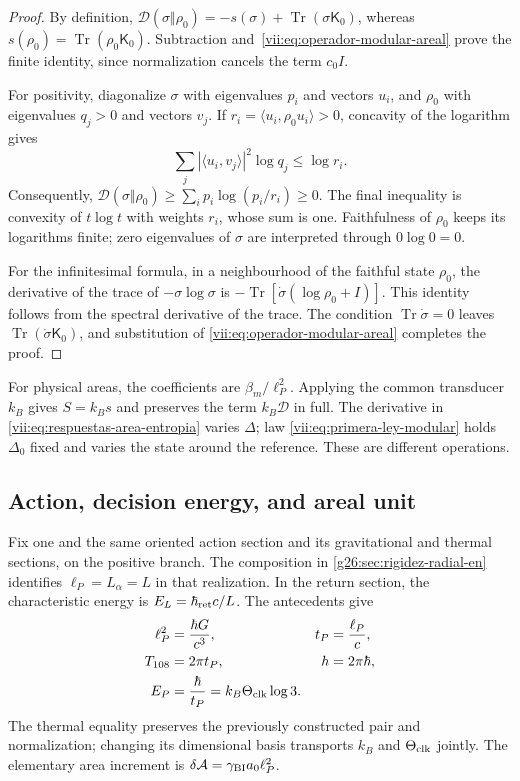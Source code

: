 \begin{proof}
By definition,
\(\mathcal D(\sigma\Vert\rho_0)=-s(\sigma)
+\operatorname{Tr}(\sigma\mathsf K_0)\), whereas
\(s(\rho_0)=\operatorname{Tr}(\rho_0\mathsf K_0)\).
Subtraction and~\eqref{vii:eq:operador-modular-areal} prove the finite
identity, since normalization cancels the term \(c_0I\).

For positivity, diagonalize \(\sigma\) with eigenvalues
\(p_i\) and vectors \(u_i\), and \(\rho_0\) with eigenvalues
\(q_j>0\) and vectors \(v_j\). If
\(r_i=\langle u_i,\rho_0u_i\rangle>0\), concavity of the
logarithm gives
\[
 \sum_j|\langle u_i,v_j\rangle|^2\log q_j\le\log r_i.
\]
Consequently,
\(\mathcal D(\sigma\Vert\rho_0)
\ge\sum_i p_i\log(p_i/r_i)\ge0\).
The final inequality is convexity of \(t\log t\) with weights
\(r_i\), whose sum is one. Faithfulness of \(\rho_0\) keeps its
logarithms finite; zero eigenvalues of \(\sigma\) are
interpreted through \(0\log0=0\).

For the infinitesimal formula, in a neighbourhood of the faithful state \(\rho_0\),
the derivative of the trace of \(-\sigma\log\sigma\) is
\(-\operatorname{Tr}[\dot\sigma(\log\rho_0+I)]\).
This identity follows from the spectral derivative of the trace.
The condition \(\operatorname{Tr}\dot\sigma=0\) leaves
\(\operatorname{Tr}(\dot\sigma\mathsf K_0)\), and substitution of
\eqref{vii:eq:operador-modular-areal} completes the proof.
\end{proof}

For physical areas, the coefficients are \(\beta_m/\ell_P^2\).
Applying the common transducer \(k_B\) gives \(S=k_Bs\) and
preserves the term \(k_B\mathcal D\) in full. The derivative in
\eqref{vii:eq:respuestas-area-entropia} varies \(\Delta\); law
\eqref{vii:eq:primera-ley-modular} holds \(\Delta_0\) fixed and
varies the state around the reference. These are different operations.

\subsection{Action, decision energy, and areal unit}
\label{vii:subsec:conversion-informacion-area}

Fix one and the same oriented action section and its gravitational
and thermal sections, on the positive branch. The composition in
\ref{g26:sec:rigidez-radial-en} identifies \(\ell_P=L_\alpha=L\)
in that realization. In the return section, the characteristic energy is
\(E_L=\hbar_{\rm ret}c/L\). The antecedents give
\begin{equation}
 \begin{aligned}
 \ell_P^2&=\frac{\hbar G}{c^3},& t_P&=\frac{\ell_P}{c},\\
 T_{108}&=2\pi t_P,& h&=2\pi\hbar,\\
 E_P&=\frac{\hbar}{t_P}=k_B\Theta_{\rm clk}\log3.&&
 \end{aligned}
 \label{vii:eq:unidad-accion-informacion}
\end{equation}
The thermal equality preserves the previously constructed pair and
normalization; changing its dimensional basis transports
\(k_B\) and \(\Theta_{\rm clk}\) jointly. The elementary area increment is
\(\delta\mathcal A=\gamma_{\rm BI}a_0\ell_P^2\).

